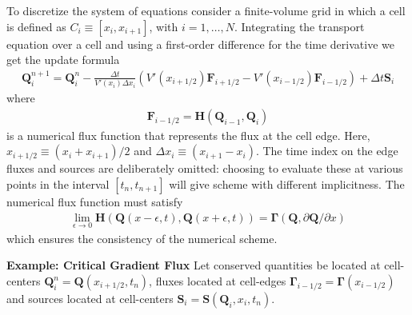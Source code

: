 \documentclass[11pt]{amsart}
\newcommand{\pfracb}[2]{\partial #1/\partial #2}
\newcommand{\mvec}[1]{\mathbf{#1}}
\newcommand{\gvec}[1]{\boldsymbol{#1}}
\theoremstyle{example}
\begin{document}
To discretize the system of equations consider a finite-volume grid in
which a cell is defined as $C_i \equiv [x_i, x_{i+1}]$, with
$i=1,\ldots,N$. Integrating the transport equation over a
cell and using a first-order difference for the time derivative we get
the update formula
\begin{align}
  \mvec{Q}_i^{n+1} = \mvec{Q}^n_i - \frac{\Delta t}{V'(x_i) \Delta x_i}
  \left (
    V'(x_{i+1/2}) \mvec{F}_{i+1/2} - 
    V'(x_{i-1/2}) \mvec{F}_{i-1/2}
  \right)
  +
  \Delta t \mvec{S}_i \label{eqn:update-form}
\end{align}
where
\begin{align}
  \mvec{F}_{i-1/2} = 
  \mvec{H}(
  \mvec{Q}_{i-1},
  \mvec{Q}_i
  ) \label{eqn:flux-func}
\end{align}
is a numerical flux function that represents the flux at the cell
edge. Here, $x_{i+1/2} \equiv (x_i+x_{i+1})/2$ and $\Delta x_i \equiv
(x_{i+1}-x_i)$. The time index on the edge fluxes and sources are
deliberately omitted: choosing to evaluate these at various points in
the interval $[t_n,t_{n+1}]$ will give scheme with different
implicitness. The numerical flux function must satisfy
\begin{align}
  \lim_{\epsilon\rightarrow 0} \mvec{H}
  \left(
    \mvec{Q}(x-\epsilon,t),
    \mvec{Q}(x+\epsilon,t)
  \right)
  =
  \mvec{\Gamma}(\mvec{Q},\pfracb{\mvec{Q}}{x})
\end{align}
which ensures the consistency of the numerical scheme.

{\bf Example: Critical Gradient Flux} Let conserved quantities be
located at cell-centers $\mvec{Q}_i^n = \mvec{Q}(x_{i+1/2},t_n)$,
fluxes located at cell-edges $\gvec{\Gamma}_{i-1/2} =
\gvec{\Gamma}(x_{i-1/2})$ and sources located at cell-centers
$\mvec{S}_i = \mvec{S}(\mvec{Q}_i, x_i,t_{n})$.
\end{document}

